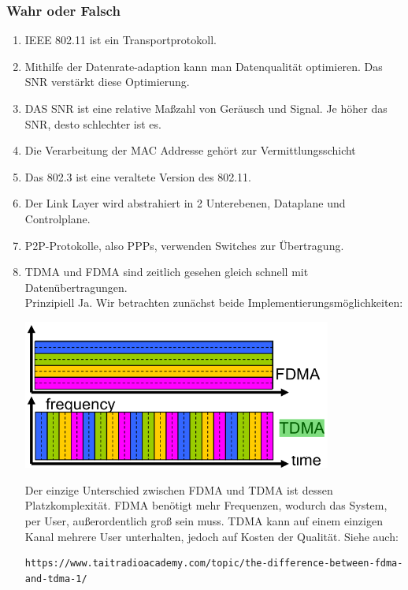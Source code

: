 \documentclass{article}
\begin{document}
    \subsubsection{Wahr oder Falsch}
    \begin{enumerate}
        \item IEEE 802.11 ist ein Transportprotokoll.
        \item Mithilfe der Datenrate-adaption kann man Datenqualität optimieren. Das SNR verstärkt diese Optimierung.
        \item DAS SNR ist eine relative Maßzahl von Geräusch und Signal. Je höher das SNR, desto schlechter ist es.
        \item Die Verarbeitung der MAC Addresse gehört zur Vermittlungsschicht
        \item Das 802.3 ist eine veraltete Version des 802.11.
        \item Der Link Layer wird abstrahiert in 2 Unterebenen, Dataplane und Controlplane.
        \item P2P-Protokolle, also PPPs, verwenden Switches zur Übertragung.\\
        
        
        \item TDMA und FDMA sind zeitlich gesehen gleich schnell mit Datenübertragungen.\\
        Prinzipiell Ja. Wir betrachten zunächst beide Implementierungsmöglichkeiten:
        \begin{center}
            \includegraphics[width=0.8\textwidth]{TDMAvsFDMA.png}
        \end{center}
        Der einzige Unterschied zwischen FDMA und TDMA ist dessen Platzkomplexität. FDMA benötigt mehr Frequenzen, wodurch das System, per User, außerordentlich groß sein muss.
        TDMA kann auf einem einzigen Kanal mehrere User unterhalten, jedoch auf Kosten der Qualität.
        Siehe auch: 
        \begin{verbatim}
https://www.taitradioacademy.com/topic/the-difference-between-fdma-and-tdma-1/
        \end{verbatim}
        

\end{enumerate}
\end{document}
